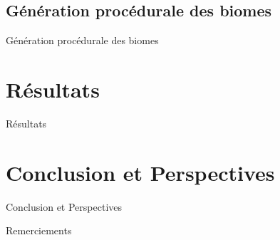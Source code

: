 \documentclass[aspectratio=169]{beamer}
\begin{document}
\subsection{Génération procédurale des biomes}

\begin{frame}{Génération procédurale des biomes}
    
\end{frame}


\section{Résultats}

\begin{frame}{Résultats}
    
\end{frame}


\section{Conclusion et Perspectives}

\begin{frame}{Conclusion et Perspectives}
    
\end{frame}


\begin{frame}{Remerciements}
    
\end{frame}
\end{document}

